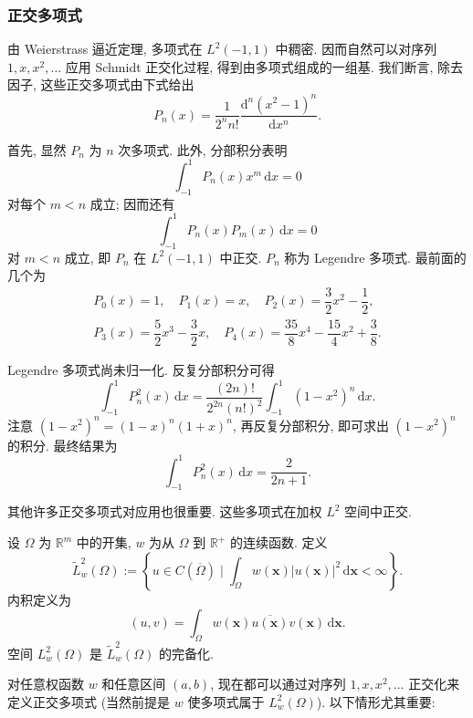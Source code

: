 \subsubsection{正交多项式}\label{subsec:orthogonal-polynomials}

由 Weierstrass 逼近定理, 多项式在 $L^2(-1,1)$ 中稠密. 因而自然可以对序列 $1,x,x^2,\ldots$ 应用 Schmidt 正交化过程, 得到由多项式组成的一组基. 我们断言, 除去因子, 这些正交多项式由下式给出
\begin{equation}\label{eq:legendre-polynomial-rodrigues-formula}
P_n(x)=\dfrac1{2^nn!}\dfrac{\mathrm{d}^n(x^2-1)^n}{\mathrm{d}x^n}.
\end{equation}


首先, 显然 $P_n$ 为 $n$ 次多项式. 此外, 分部积分表明
\begin{equation}\label{eq:legendre-lower-monomial-orthogonality}
\int_{-1}^1 P_n(x)x^m\,\mathrm{d}x=0
\end{equation}
对每个 $m<n$ 成立; 因而还有
\begin{equation}\label{eq:legendre-polynomial-pairwise-orthogonality}
\int_{-1}^1 P_n(x)P_m(x)\,\mathrm{d}x=0
\end{equation}
对 $m<n$ 成立, 即 $P_n$ 在 $L^2(-1,1)$ 中正交. $P_n$ 称为 Legendre 多项式. 最前面的几个为
\begin{equation}\label{eq:first-five-legendre-polynomials}
\begin{gathered}
P_0(x)=1,\quad P_1(x)=x,\quad P_2(x)=\dfrac32x^2-\dfrac12,\\
P_3(x)=\dfrac52x^3-\dfrac32x,\quad P_4(x)=\dfrac{35}8x^4-\dfrac{15}4x^2+\dfrac38.
\end{gathered}
\end{equation}


Legendre 多项式尚未归一化. 反复分部积分可得
\begin{equation}\label{eq:legendre-square-integral-reduction}
\int_{-1}^1 P_n^2(x)\,\mathrm{d}x=\dfrac{(2n)!}{2^{2n}(n!)^2}\int_{-1}^1(1-x^2)^n\,\mathrm{d}x.
\end{equation}
注意 $(1-x^2)^n=(1-x)^n(1+x)^n$, 再反复分部积分, 即可求出 $(1-x^2)^n$ 的积分. 最终结果为
\begin{equation}\label{eq:legendre-square-integral-value}
\int_{-1}^1 P_n^2(x)\,\mathrm{d}x=\dfrac2{2n+1}.
\end{equation}


其他许多正交多项式对应用也很重要. 这些多项式在加权 $L^2$ 空间中正交.

\begin{Definition}
\label{def:weighted-lp-two-space}
设 $\Omega$ 为 $\mathbb{R}^m$ 中的开集, $w$ 为从 $\Omega$ 到 $\mathbb{R}^+$ 的连续函数. 定义
\begin{equation}\label{eq:weighted-continuous-lp-two-space}
\widetilde L_w^2(\Omega):=\left\{u\in C(\overline\Omega)\mid\int_\Omega w(\bm{x})|u(\bm{x})|^2\,\mathrm{d}\bm{x}<\infty\right\}.
\end{equation}
内积定义为
\begin{equation}\label{eq:weighted-lp-two-inner-product}
(u,v)=\int_\Omega w(\bm{x})\overline{u(\bm{x})}v(\bm{x})\,\mathrm{d}\bm{x}.
\end{equation}
空间 $L_w^2(\Omega)$ 是 $\widetilde L_w^2(\Omega)$ 的完备化.
\end{Definition}

对任意权函数 $w$ 和任意区间 $(a,b)$, 现在都可以通过对序列 $1,x,x^2,\ldots$ 正交化来定义正交多项式 (当然前提是 $w$ 使多项式属于 $L_w^2(\Omega)$). 以下情形尤其重要:
